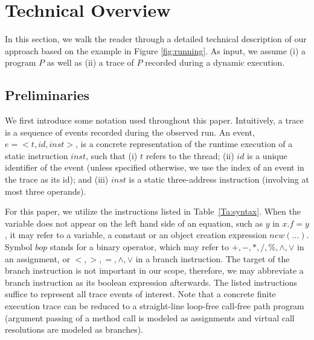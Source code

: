 \section{Technical Overview}\label{sec:overview}

In this section, we walk the reader through a detailed technical description of our approach based on the example in Figure \ref{fig:running}. 
%
As input, we assume (i) a program $P$ as well as (ii) a trace of $P$ recorded during a dynamic execution.



\subsection{Preliminaries}
We first introduce some notation used throughout this paper. Intuitively, a 
trace is a sequence of events recorded during the observed run. An 
event, $e=<t, id, inst>$, is a concrete representation of the runtime 
execution of a static instruction $inst$, such that (i) $t$ refers to the 
thread; (ii) $id$ is a unique identifier of the event (unless specified 
otherwise, we use the index of an event in the trace as its id); 
and (iii) $inst$ is a static three-address instruction (involving at most three operands).


For this paper, we utilize the instructions listed in 
Table~\ref{Ta:syntax}. When the variable does not appear on the left hand 
side of an equation, such as $y$ in $x.f=y$, it may refer to a variable, a 
constant or an object creation expression $new (...)$.  Symbol $bop$ stands 
for a binary operator, which may refer to $+, -, *, /, \%, \wedge, \vee$ in 
an assignment, or  $<, >, =, \wedge, \vee$ in a branch instruction. 
The target of the branch instruction is not important in our scope, 
therefore, we may abbreviate a branch instruction as its boolean expression 
afterwards. The listed instructions suffice to represent all trace events 
of interest. 
Note that 
a concrete finite execution trace can be reduced to a straight-line 
loop-free call-free path program  (argument passing of a method call 
is modeled as assignments and virtual call resolutions are modeled as 
branches). 

